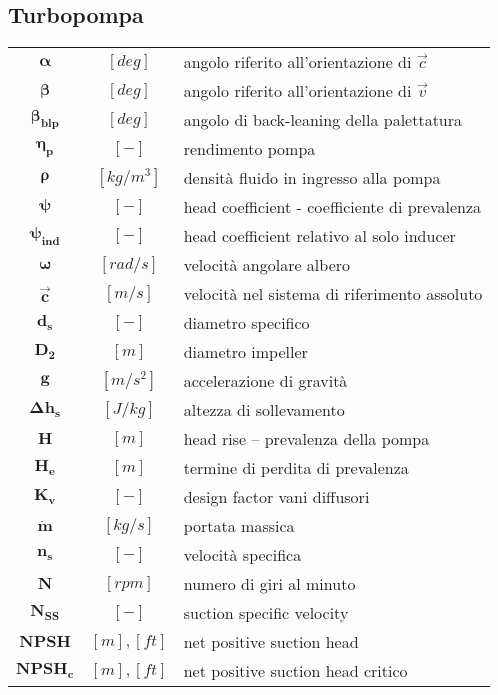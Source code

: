 \begin{multicols}{2}
	\subsection{Turbopompa}
	\begin{tabularx}{\linewidth}{cc>{\raggedright\arraybackslash}X}
		$\bm{\alpha}$ & $[deg]$ & angolo riferito all'orientazione di $\overrightarrow{c}$ \\
		$\bm{\beta}$ & $[deg]$ & angolo riferito all'orientazione di $\overrightarrow{v}$ \\
                $\bm{\beta_{blp}}$ & $[deg]$ & angolo di back-leaning della palettatura \\
		$\bm{\eta_p}$ & $[-]$ & rendimento pompa \\
                $\bm{\rho}$ & $[kg/m^3]$ & densità fluido in ingresso alla pompa \\
                $\bm{\psi}$ & $[-]$ & head coefficient - coefficiente di prevalenza \\
		$\bm{\psi_{ind}}$ & $[-]$ & head coefficient relativo al solo inducer \\
		$\bm{\omega}$ & $[rad/s]$ & velocità angolare albero \\
                $\bm{\overrightarrow{c}}$ & $[m/s]$ & velocità nel sistema di riferimento assoluto \\
	        $\bm{d_s}$ & $[-]$ & diametro specifico \\
		$\bm{D_2}$ & $[m]$ & diametro impeller \\
		$\bm{g}$ & $[m/s^2]$ & accelerazione di gravità \\
                $\bm{\Delta h_s}$ & $[J/kg]$ & altezza di sollevamento \\
                $\bm{H}$ & $[m]$ & head rise – prevalenza della pompa \\
		$\bm{H_e}$ & $[m]$ & termine di perdita di prevalenza \\
		$\bm{K_v}$ & $[-]$ & design factor vani diffusori \\
                $\bm{\dot m}$ & $[kg/s]$ & portata massica \\
                $\bm{n_s}$ & $[-]$ & velocità specifica \\
		$\bm{N}$ & $[rpm]$ & numero di giri al minuto \\
		$\bm{N_{SS}}$ & $[-]$ & suction specific velocity \\
                $\bm{NPSH}$ & $[m], [ft]$ & net positive suction head \\
                $\bm{NPSH_c}$ & $[m], [ft]$ & net positive suction head critico \\

\end{tabularx}
\end{multicols}
